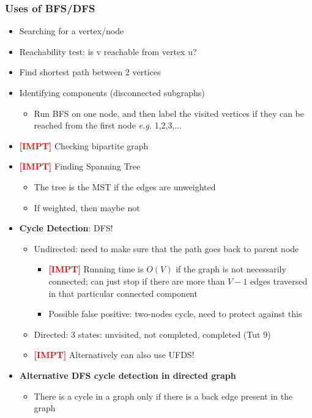 \documentclass{article}
\newcommand{\eg}[0]{\textit{e.g. }}
\newcommand{\impt}[0]{\textcolor{red}{\textbf{[IMPT] }}}
\begin{document}
\begin{multicols}{2}
\subsubsection{Uses of BFS/DFS}
\begin{itemize}
	\item Searching for a vertex/node
	\item Reachability test: is v reachable from vertex u?
	\item Find shortest path between 2 vertices
	\item Identifying components (disconnected subgraphs)
	\begin{itemize}
		\item Run BFS on one node, and then label the visited vertices if they can be reached from the first node \eg 1,2,3,...
	\end{itemize}
    \item \impt Checking bipartite graph
    \item \impt Finding Spanning Tree
    \begin{itemize}
    	\item The tree is the MST if the edges are unweighted
    	\item If weighted, then maybe not
    \end{itemize}
    \item \textbf{Cycle Detection}: DFS!
    \begin{itemize}
    	\item Undirected: need to make sure that the path goes back to parent node
    	\begin{itemize}
    		\item \impt Running time is $O(V)$ if the graph is not necessarily connected; can just stop if there are more than $V-1$ edges traversed in that particular connected component
    		\item Possible false positive: two-nodes cycle, need to protect against this
    	\end{itemize}
        \item Directed: 3 states: unvisited, not completed, completed (Tut 9)
        \item \impt Alternatively can also use UFDS!
    \end{itemize}
    \item \textbf{Alternative DFS cycle detection in directed graph}
    \begin{itemize}
    	\item There is a cycle in a graph only if there is a back edge present in the graph

\end{itemize}
\end{itemize}
\end{multicols}
\end{document}
